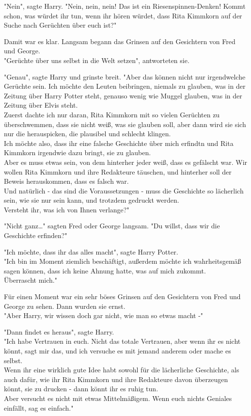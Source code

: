 {"Nein", sagte Harry. "Nein, nein, nein! Das ist ein Riesenspinnen-Denken! Kommt schon, was würdet ihr tun, wenn ihr hören würdet, dass Rita Kimmkorn auf der Suche nach Gerüchten über euch ist?"

Damit war es klar. Langsam begann das Grinsen auf den Gesichtern von Fred und George.\\ "Gerüchte über uns selbst in die Welt setzen", antworteten sie.

"Genau", sagte Harry und grinste breit. "Aber das können nicht nur irgendwelche Gerüchte sein. Ich möchte den Leuten beibringen, niemals zu glauben, was in der Zeitung über Harry Potter steht, genauso wenig wie Muggel glauben, was in der Zeitung über Elvis steht.\\ Zuerst dachte ich nur daran, Rita Kimmkorn mit so vielen Gerüchten zu überschwemmen, dass sie nicht weiß, was sie glauben soll, aber dann wird sie sich nur die herauspicken, die plausibel und schlecht klingen.\\ Ich möchte also, dass ihr eine falsche Geschichte über mich erfindtn und Rita Kimmkorn irgendwie dazu bringt, sie zu glauben.\\ Aber es muss etwas sein, von dem hinterher jeder weiß, dass es gefälscht war. Wir wollen Rita Kimmkorn und ihre Redakteure täuschen, und hinterher soll der Beweis herauskommen, dass es falsch war.\\ Und natürlich - das sind die Voraussetzungen - muss die Geschichte so lächerlich sein, wie sie nur sein kann, und trotzdem gedruckt werden.\\ Versteht ihr, was ich von Ihnen verlange?"

"Nicht ganz…" sagten Fred oder George langsam. "Du willst, dass wir die Geschichte erfinden?"

"Ich möchte, dass ihr das alles macht", sagte Harry Potter.\\ "Ich bin im Moment ziemlich beschäftigt, außerdem möchte ich wahrheitsgemäß sagen können, dass ich keine Ahnung hatte, was auf mich zukommt.\\ Überrascht mich."

Für einen Moment war ein sehr böses Grinsen auf den Gesichtern von Fred und George zu sehen. Dann wurden sie ernst.\\ "Aber Harry, wir wissen doch gar nicht, wie man so etwas macht -"

"Dann findet es heraus", sagte Harry.\\ "Ich habe Vertrauen in euch. Nicht das totale Vertrauen, aber wenn ihr es nicht könnt, sagt mir das, und ich versuche es mit jemand anderem oder mache es selbst.\\ Wenn ihr eine wirklich gute Idee habt sowohl für die lächerliche Geschichte, als auch dafür, wie ihr Rita Kimmkorn und ihre Redakteure davon überzeugen könnt, sie zu drucken - dann könnt ihr es ruhig tun.\\ Aber versucht es nicht mit etwas Mittelmäßigem. Wenn euch nichts Geniales einfällt, sag es einfach."

}
